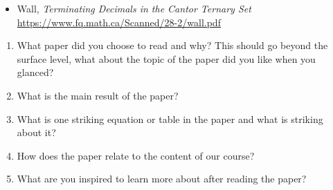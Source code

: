 \documentclass[12pt]{article}
\begin{document}
\begin{enumerate}
\begin{itemize}
			\item Wall, \textit{Terminating Decimals in the Cantor Ternary Set}\\
			\url{https://www.fq.math.ca/Scanned/28-2/wall.pdf}
		\end{itemize}
		\begin{enumerate}
			\item\label{first_part} What paper did you choose to read and why? This should go beyond the surface level, what about the topic of the paper did you like when you glanced?
			\vfill
			\newpage
			\item What is the main result of the paper?
			\vfill
			\item What is one striking equation or table in the paper and what is striking about it?
			\vfill
			\item How does the paper relate to the content of our course?
			\vfill
			\item\label{last_part} What are you inspired to learn more about after reading the paper?
			\vfill		
		\end{enumerate}
	\end{enumerate}
\end{document}
